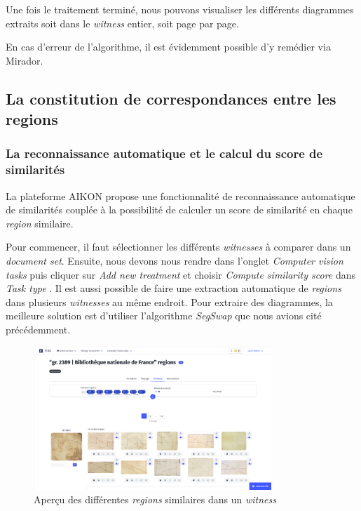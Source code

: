 Une fois le traitement terminé, nous pouvons visualiser les différents diagrammes extraits soit dans le \textit{witness} entier, soit page par page.

En cas d'erreur de l'algorithme, il est évidemment possible d'y remédier via Mirador.

\subsection{La constitution de correspondances entre les regions}

\subsubsection{La reconnaissance automatique et le calcul du score de similarités}

La plateforme AIKON propose une fonctionnalité de reconnaissance automatique de similarités couplée à la possibilité de calculer un score de similarité en chaque \textit{region} similaire. 

Pour commencer, il faut sélectionner les différents \textit{witnesses} à comparer dans un \textit{document set}. Ensuite, nous devons nous rendre dans l'onglet \og \textit{Computer vision tasks} \fg puis cliquer sur \og \textit{Add new treatment} \fg et choisir \og \textit{Compute similarity score} \fg dans \og \textit{Task type} \fg. Il est aussi possible de faire une extraction automatique de \textit{regions} dans plusieurs \textit{witnesses} au même endroit. Pour extraire des diagrammes, la meilleure solution est d'utiliser l'algorithme \textit{SegSwap} que nous avions cité précédemment. 

\begin{figure}[H]
	\centering
	\includegraphics[width=0.8\textwidth]{images/similarities.png}
	\caption{Aperçu des différentes \textit{regions} similaires dans un \textit{witness}}
	\label{fig:apercu_similarites}
\end{figure}


